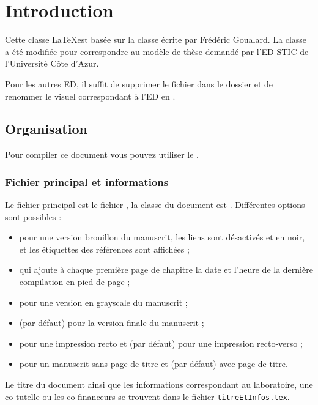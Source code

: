 
\chapter{Introduction}

Cette classe \LaTeX est basée sur la classe  écrite par Frédéric Goualard. La classe a été modifiée pour correspondre au modèle de thèse demandé par l'ED STIC de l'Université Côte d'Azur.

Pour les autres ED, il suffit de supprimer le fichier  dans le dossier  et de renommer le visuel correspondant à l'ED en .

\section{Organisation}
  
  Pour compiler ce document vous pouvez utiliser le .

  \subsection{Fichier principal et informations}
  Le fichier principal est le fichier , la classe du document est . 
  Différentes options sont possibles :
  \begin{itemize}
    \item {} pour une version brouillon du manuscrit, les liens sont désactivés et en noir, et les étiquettes des références sont affichées ;
    \item {} qui ajoute à chaque première page de chapitre la date et l'heure de la dernière compilation en pied de page ;
    \item {} pour une version en grayscale du manuscrit ;
    \item {} (par défaut) pour la version finale du manuscrit ;
    \item {} pour une impression recto et  (par défaut) pour une impression recto-verso ;
    \item {} pour un manuscrit sans page de titre et  (par défaut) avec page de titre.
  \end{itemize}
  
  Le titre du document ainsi que les informations correspondant au laboratoire, une co-tutelle ou les co-financeurs se trouvent dans le fichier \texttt{titreEtInfos.tex}.
  
